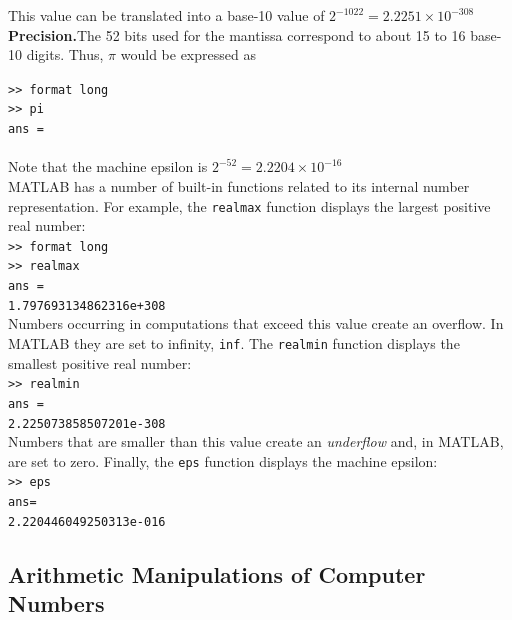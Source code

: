 \documentclass[../main.tex]{subfiles}
\begin{document}
\noindent
This value can be translated into a base-10 value of $2^{-1022}=2.2251\times10^{-308}$\\

\noindent
\textbf{Precision.}\quad The 52 bits used for the mantissa correspond to about 15 to 16 base-10 digits.
Thus, $\pi$ would be expressed as

\texttt{>> format long\\
\indent >> pi\\
\indent ans =\\
\indent{}}\\

\noindent
Note that the machine epsilon is $2^{-52}=2.2204\times 10^{-16}$\\

MATLAB has a number of built-in functions related to its internal number representation.
For example, the \texttt{realmax} function displays the largest positive real number:\\

\texttt{>> format long\\
\indent >> realmax\\
\indent ans =\\
\indent\indent 1.797693134862316e+308}\\

Numbers occurring in computations that exceed this value create an overflow. In MATLAB
they are set to infinity, \texttt{inf}. The \texttt{realmin} function displays the smallest positive real
number:\\

\texttt{>> realmin\\
\indent ans =\\
\indent\indent 2.225073858507201e-308}\\

\noindent
Numbers that are smaller than this value create an \emph{underflow} and, in MATLAB, are set to
zero. Finally, the \texttt{eps} function displays the machine epsilon:\\

\texttt{>> eps\\
\indent ans=\\
\indent\indent 2.220446049250313e-016}\\

\subsection{Arithmetic Manipulations of Computer Numbers}
\end{document}
